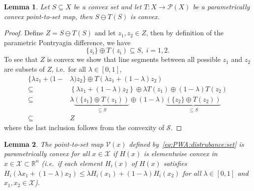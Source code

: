\documentclass[letterpaper, 10pt, conference]{ieeeconf} %
\newtheorem{thm}{Lemma}[section]
\begin{document}
%
    \begin{thm}\label{thm:convexity:of:pontryagin:difference}
      Let $S\subseteq X$ be a convex set and let $T:X\rightarrow\mathcal P(X)$ be a parametrically convex point-to-set
      map, then $S\ominus T(S)$ is convex. 
    \end{thm}
%
    \begin{proof}
      Define $ Z =  S\ominus T( S)$ and let $z_1,z_2\in Z$, then
      by definition of the parametric Pontryagin difference, we have
\[%
        \{z_i\} \oplus T(z_i) \subseteq S,\; i=1,2.
\]%
      To see that $ Z$ is convex we show that line segments between
      all possible $z_1$ and $z_2$ are subsets of $ Z$, i.e.~for all $\lambda \in [0,1]$,
      \[\begin{aligned}
        \{ \lambda z_1 + (1-&\lambda)z_2
        \}\oplus T\left( \lambda z_1 + (1-\lambda)z_2\right)\\
        \subseteq&\left\{ \lambda z_1 + (1-\lambda)z_2
        \right\}\oplus \lambda T(z_1) \oplus (1-\lambda)
         T(z_2)\\
        \subseteq &\lambda\underbrace{(\{z_1\}\oplus T(z_1))}_{\subseteq S}\oplus
        (1-\lambda)\underbrace{(\{z_2\}\oplus T(z_2))}_{\subseteq S}\\
        \subseteq& Z
        \end{aligned}\]
      where the last inclusion follows from the convexity of $\mathcal S$.
    \end{proof}
%
%
    \begin{thm}\label{thm:convex:parametric:set}
      The point-to-set map $\mathcal V (x)$ defined by~\eqref{eq:PWA:distrubance:set} is parametrically 
      convex for all $x\in \mathcal X$ if $H(x)$ is elementwise convex in $x\in \mathcal X\subset \mathbb R^n$ (i.e.~if each element $H_i(x)$ of $H(x)$ satisfies
    $H_i(\lambda x_1+(1-\lambda)x_2)\leq \lambda H_i(x_1)+(1-\lambda)H_i(x_2)$ for all    $\lambda\in[0,1]$ and $x_1, x_2\in\mathcal X$).
    \end{thm}
\end{document}
